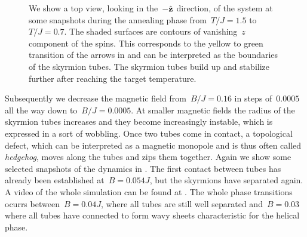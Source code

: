 \begin{figure}[H]
  \centering
  \caption{We show a top view, \ie{} looking in the~$-\hat{\mathbf{z}}$ direction, of the
  system at some snapshots during the annealing phase from~$T/J = 1.5$
  to~$T/J=0.7$. The shaded surfaces are contours of vanishing~$z$ component of
  the spins. This corresponds to the yellow to green transition of the arrows in
   and can be interpreted as the boundaries of the skyrmion
  tubes. The skyrmion tubes build up and stabilize further after reaching the
  target temperature.}
\label{fig:skyrmanneal}
\end{figure}

Subsequently we decrease the magnetic field from~$B/J=0.16$ in steps of~$0.0005$
all the way down to~$B/J=0.0005$. At smaller magnetic fields the radius of the
skyrmion tubes increases and they become increasingly instable, which is
expressed in a sort of wobbling. Once two tubes come in
contact, a topological defect, which can be interpreted as a magnetic monopole
and is thus often called \emph{hedgehog}, moves along the tubes and zips them
together. Again we show some selected snapshots of the dynamics in
. The first contact between tubes has already been
established at~$B=0.054 J$, but the skyrmions have separated again. A video of
the whole simulation can be found at . The whole phase
transitions ocurrs between~$B= 0.04 J$, where all tubes are still well separated
and~$B= 0.03$ where all tubes have connected to form wavy sheets characteristic
for the helical phase.

